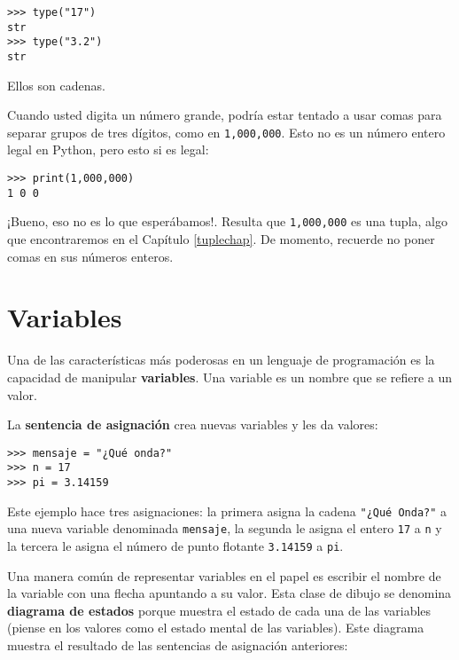 \begin{lstlisting}
>>> type("17")
str
>>> type("3.2")
str
\end{lstlisting}

Ellos son cadenas.

Cuando usted digita un número grande, podría estar tentado a usar
comas para separar grupos de tres dígitos, como en \texttt{1,000,000}.
Esto no es un número entero legal en Python, pero esto si es legal:

\begin{lstlisting}
>>> print(1,000,000)
1 0 0
\end{lstlisting}

¡Bueno, eso no es lo que esperábamos!. Resulta que \texttt{1,000,000}
es una tupla, algo que encontraremos en el Capítulo \ref{tuplechap}.
De momento, recuerde no poner comas en sus números enteros.

\section{Variables}

  

Una de las características más poderosas en un lenguaje de programación
es la capacidad de manipular \textbf{variables}. Una variable es un
nombre que se refiere a un valor.

La \textbf{sentencia de asignación} crea nuevas variables y les da
valores:

\begin{lstlisting}
>>> mensaje = "¿Qué onda?"
>>> n = 17
>>> pi = 3.14159
\end{lstlisting}

Este ejemplo hace tres asignaciones: la primera asigna la cadena {\verb+"¿Qué Onda?"+}
a una nueva variable denominada \texttt{mensaje}, la segunda le asigna
el entero \texttt{17} a \texttt{n} y la tercera le asigna el número
de punto flotante \texttt{3.14159} a \texttt{pi}.


Una manera común de representar variables en el papel es escribir
el nombre de la variable con una flecha apuntando a su valor. Esta
clase de dibujo se denomina \textbf{diagrama de estados} porque muestra
el estado de cada una de las variables (piense en los valores como
el estado mental de las variables). Este diagrama muestra el resultado
de las sentencias de asignación anteriores:

